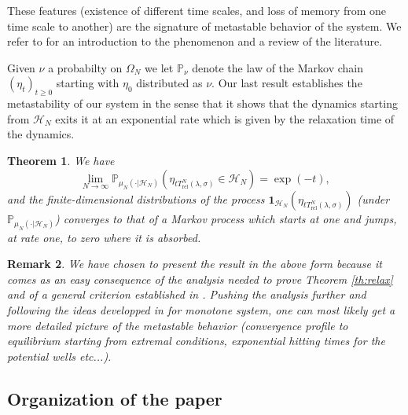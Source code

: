 \documentclass[reqno,11pt]{amsart}
\numberwithin{equation}{section}
\newcommand{\bbP}{{\ensuremath{\mathbb P}} }
\newcommand{\gO}{\Omega}
\newcommand{\cH}{{\ensuremath{\mathcal H}} }
\newcommand{\ind}{\mathbf{1}}
\newtheorem{theorem}{Theorem}[section]
\newtheorem{rem}[theorem]{Remark}
\newcommand{\Rel}{\mathrm{rel}}
\begin{document}
\medskip

These features (existence of different time scales, and loss of memory from one time scale to another) are the signature of metastable behavior of the system. We refer to \cite{bovier2016metastability, landim2019metastable} for an introduction to the phenomenon and a review of the literature. 

\medskip

Given $\nu$ a probabilty on $\gO_N$ we  let $\bbP_{\nu}$ denote the law of the Markov chain  $(\eta_t)_{t\geq 0}$ starting with $\eta_0$ distributed as $\nu$.
Our last result establishes the metastability of our system in the sense that it shows that the dynamics starting from $\cH_N$ exits it at an exponential rate which is given by the relaxation time of the dynamics.



\begin{theorem}\label{th:metastablemacro}
We have
\begin{equation*}
 \lim_{N\to \infty} 
 \mathbb{P}_{ \mu_N(\cdot \vert \cH_N)}
 \left( \eta_{t T_{\Rel}^N(\lambda, \sigma)}
 \in \cH_N \right)=\exp(-t),
\end{equation*}
and
the finite-dimensional distributions of the process $\ind_{\cH_N}(\eta_{t T_{\Rel}^N(\lambda, \sigma)})$ (under  $\mathbb{P}_{ \mu_N(\cdot \vert \cH_N)}$) converges to that of a Markov process which starts at one and jumps, at rate one, to zero where it is absorbed.
\end{theorem}



\begin{rem}
 We have chosen to present the result in the above form because it comes as an easy consequence of the analysis needed to prove Theorem \ref{th:relax} and of a general criterion established in \cite{beltran2015martingale}. Pushing the analysis further and following the ideas developped in \cite[Section 1.3]{caputo2012polymer} for monotone system, one can  most likely get a more detailed picture of the metastable behavior (convergence profile to equilibrium starting from extremal conditions, exponential hitting times for the potential wells etc...).
 
\end{rem}




\subsection{Organization of the paper}
\end{document}
